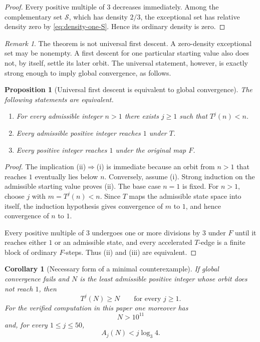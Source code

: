 \documentclass[11pt]{article}
\newtheorem{proposition}[theorem]{Proposition}
\newtheorem{corollary}[theorem]{Corollary}
\theoremstyle{definition}
\theoremstyle{remark}
\newtheorem{remark}[theorem]{Remark}
\newcommand{\Sset}{\mathcal S}
\begin{document}
\begin{proof}
Every positive multiple of $3$ decreases immediately.  Among the complementary set $\Sset$, which has density $2/3$, the exceptional set has relative density zero by \eqref{eq:density-one-S}.  Hence its ordinary density is zero.
\end{proof}

\begin{remark}
The theorem is not universal first descent.  A zero-density exceptional set may be nonempty.  A first descent for one particular starting value also does not, by itself, settle its later orbit.  The universal statement, however, is exactly strong enough to imply global convergence, as follows.
\end{remark}

\begin{proposition}[Universal first descent is equivalent to global convergence]
The following statements are equivalent.
\begin{enumerate}[label=(\roman*),leftmargin=2.4em]
\item For every admissible integer $n>1$ there exists $j\ge1$ such that $T^j(n)<n$.
\item Every admissible positive integer reaches $1$ under $T$.
\item Every positive integer reaches $1$ under the original map $F$.
\end{enumerate}
\end{proposition}

\begin{proof}
The implication (ii)$\Rightarrow$(i) is immediate because an orbit from $n>1$ that reaches $1$ eventually lies below $n$.  Conversely, assume (i).  Strong induction on the admissible starting value proves (ii).  The base case $n=1$ is fixed.  For $n>1$, choose $j$ with $m=T^j(n)<n$.  Since $T$ maps the admissible state space into itself, the induction hypothesis gives convergence of $m$ to $1$, and hence convergence of $n$ to $1$.

Every positive multiple of $3$ undergoes one or more divisions by $3$ under $F$ until it reaches either $1$ or an admissible state, and every accelerated $T$-edge is a finite block of ordinary $F$-steps.  Thus (ii) and (iii) are equivalent.
\end{proof}

\begin{corollary}[Necessary form of a minimal counterexample]
If global convergence fails and $N$ is the least admissible positive integer whose orbit does not reach $1$, then
\[
T^j(N)\ge N\qquad\text{for every }j\ge1.
\]
For the verified computation in this paper one moreover has
\[
N>10^{11}
\]
and, for every $1\le j\le50$,
\[
A_j(N)<j\log_3 4.
\]
\end{corollary}
\end{document}
